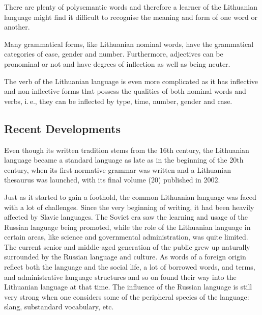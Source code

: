\begin{multicols}{2}

There are plenty of polysemantic words and therefore a learner of the Lithuanian language might find it difficult to recognise the meaning and form of one word or another. 

Many grammatical forms, like Lithuanian nominal words, have the grammatical categories of case, gender and number. Furthermore, adjectives can be pronominal or not and have degrees of inflection as well as being neuter.

The verb of the Lithuanian language is even more complicated as it has inflective and non-inflective forms that possess the qualities of both nominal words and verbs, i.\,e., they can be inflected by type, time, number, gender and case.

\subsection{Recent Developments}

Even though its written tradition stems from the 16th century, the Lithuanian language became a standard language as late as in the beginning of the 20th century, when its first normative grammar was written and a Lithuanian thesaurus was launched, with its final volume (20) published in 2002.

   Just as it started to gain a foothold, the common Lithuanian language was faced with a lot of challenges. Since the very beginning of writing, it had been heavily affected by Slavic languages. The Soviet era saw the learning and usage of the Russian language being promoted, while the role of the Lithuanian language in certain areas, like science and governmental administration, was quite limited. The current senior and middle-aged generation of the public grew up naturally surrounded by the Russian language and culture. As words of a foreign origin reflect both the language and the social life, a lot of borrowed words, and terms, and administrative language structures and so on found their way into the Lithuanian language at that time. The influence of the Russian language is still very strong when one considers some of the peripheral species of the language: slang, substandard vocabulary, etc.


\end{multicols}
